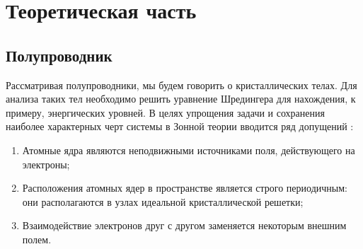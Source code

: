 \chapter{Теоретическая часть}
\section{Полупроводник}
Рассматривая полупроводники, мы будем говорить о кристаллических телах. Для анализа таких тел необходимо решить уравнение Шредингера для нахождения, к примеру, энергических уровней. В целях упрощения задачи и сохранения наиболее характерных черт системы в Зонной теории вводится ряд допущений \cite{Kalashnikov}: 
\begin{enumerate}
	\item Атомные ядра являются неподвижными источниками поля, действующего на электроны;
	\item Расположения атомных ядер в пространстве является строго периодичным: они располагаются в узлах идеальной кристаллической решетки;
	\item Взаимодействие электронов друг с другом заменяется некоторым внешним полем.
\end{enumerate}

